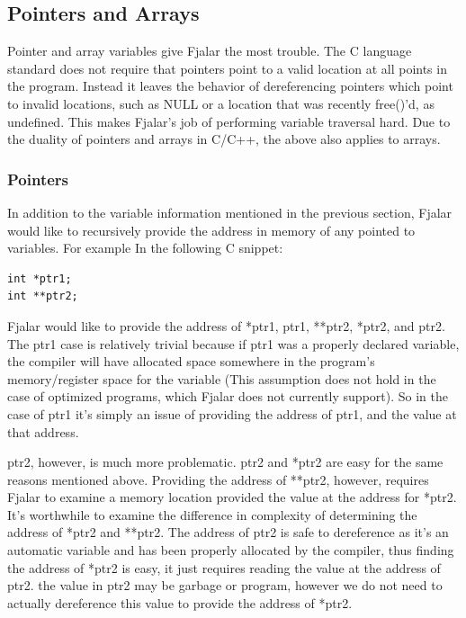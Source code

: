 \documentclass[11pt]{article}
\begin{document}
\subsection{Pointers and Arrays}
Pointer and array variables give Fjalar the most trouble. The C
language standard does not require that pointers point to a valid
location at all points in the program. Instead it leaves the behavior
of dereferencing pointers which point to invalid locations, such as
NULL or a location that was recently free()'d, as
undefined. This makes Fjalar's job of performing variable traversal
hard. Due to the duality of pointers and arrays in C/C++, the above
also applies to arrays.

\subsubsection{Pointers}
In addition to the variable information mentioned in the previous
section, Fjalar would like to recursively provide the
address in memory of any pointed to variables. For example In the
following C snippet:

\lstset{language=C, frame=single,}
\begin{lstlisting}
int *ptr1;
int **ptr2;
\end{lstlisting}

Fjalar would like to provide the address of *ptr1, ptr1, **ptr2,
*ptr2, and ptr2. The ptr1 case is relatively trivial because if ptr1
was a properly declared variable, the compiler will have allocated
space somewhere in the program's memory/register space for the
variable (This assumption does not hold in the case of optimized
programs, which Fjalar does not currently support). So in the case of
ptr1 it's simply an issue of providing the address of ptr1, and the
value at that address.

ptr2, however, is much more problematic. ptr2 and *ptr2 are easy for
the same reasons mentioned above. Providing the address of **ptr2,
however, requires Fjalar to examine a memory location provided the
value at the address for *ptr2. It's worthwhile to examine the
difference in complexity of determining the address of *ptr2 and
**ptr2. The address of ptr2 is safe
to dereference as it's an automatic variable and has been properly
allocated by the compiler, thus finding the address of *ptr2 is easy,
it just requires reading the value at the address of ptr2. the value
in ptr2 may be garbage or program, however we do not need to actually
dereference this value to provide the address of *ptr2.
\end{document}
